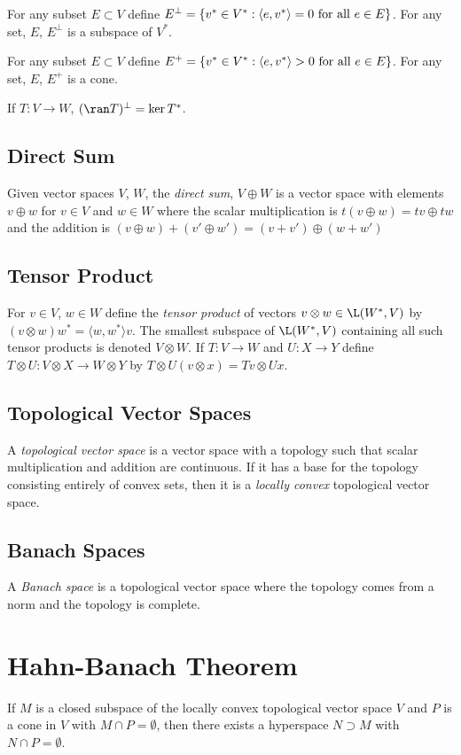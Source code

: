 For any subset $E\subset V$ define $E^\perp = \{v^*\in V^*: \langle e, v^*\rangle = 0 {\rm\ for\ all\ }e\in E\}$.
For any set, $E$, $E^\perp$ is a subspace of $V^*$.

For any subset $E\subset V$ define $E^+ = \{v^*\in V^*: \langle e, v^*\rangle > 0 {\rm\ for\ all\ }e\in E\}$.
For any set, $E$, $E^+$ is a cone.

If $T\colon V\to W$, $(\ran T)^\perp = \ker T^*$.

\subsection{Direct Sum}
Given vector spaces $V$, $W$, the {\em direct sum}, $V\oplus W$ is
a vector space with
elements $v\oplus w$ for $v\in V$ and $w\in W$ where the scalar
multiplication is $t(v\oplus w) = tv\oplus tw$ and the addition
is $(v\oplus w) + (v'\oplus w') = (v + v')\oplus(w + w')$

\subsection{Tensor Product}
For $v\in V$, $w\in W$ define the {\em tensor product} of vectors
$v\otimes w\in\L(W^*,V)$ by
$(v\otimes w)w^* = \langle w, w^*\rangle v$. The smallest
subspace of $\L(W^*,V)$ containing all such tensor products is denoted
$V\otimes W$. If $T\colon V\to W$ and $U\colon X\to Y$ define
$T\otimes U\colon V\otimes X\to W\otimes Y$ by $T\otimes U(v\otimes x)
= Tv\otimes Ux$.

\subsection{Topological Vector Spaces}
A {\em topological vector space} is a vector space with a topology
such that scalar multiplication and addition are continuous. If it has
a base for the topology consisting entirely of convex sets, then it
is a {\em locally convex} topological vector space.

\subsection{Banach Spaces}
A {\em Banach space} is a topological vector space where the topology
comes from a norm and the topology is complete.

\section{Hahn-Banach Theorem}
\begin{theorem}
If $M$ is a closed subspace of the locally convex topological vector space $V$ and
$P$ is a cone in $V$ with $M\cap P=\emptyset$, then there exists a hyperspace
$N\supset M$ with $N\cap P=\emptyset$.
\end{theorem}

